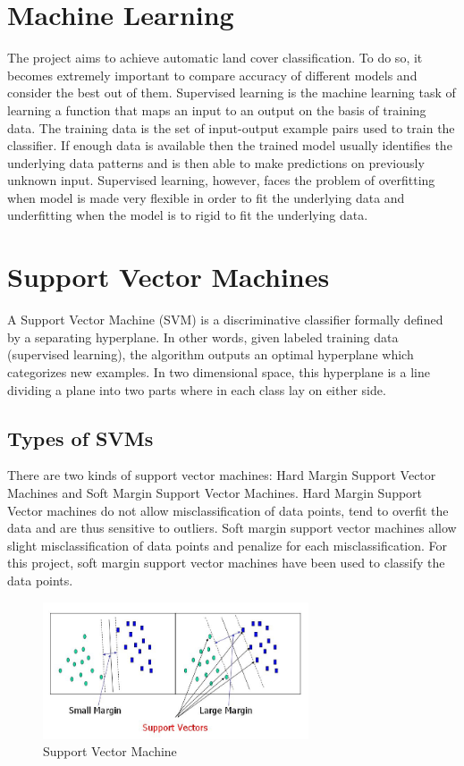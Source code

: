 \documentclass[12pt, a4paper]{report}
\begin{document}
\section{Machine Learning}
The project aims to achieve automatic land cover classification. To do so, it becomes extremely important to compare accuracy of different models and  consider the best out of them.
Supervised learning is the machine learning task of learning a function that maps an input to an output on the basis of training data.\cite{supervisedlearningone, supervisedlearningtwo} The training data is the set of input-output example pairs used to train the classifier. If enough data is available then the trained model usually identifies the underlying data patterns and is then able to make predictions on previously unknown input. Supervised learning, however, faces the problem of overfitting when model is made very flexible in order to fit the underlying data and underfitting when the model is to rigid to fit the underlying data.
\section{Support Vector Machines}
A Support Vector Machine (SVM) is a discriminative classifier formally defined by a separating hyperplane. In other words, given labeled training data (supervised learning), the algorithm outputs an optimal hyperplane which categorizes new examples. In two dimensional space, this hyperplane is a line dividing a plane into two parts where in each class lay on either side.\cite{supportvectormachines}
\subsection{Types of SVMs}
There are two kinds of support vector machines: Hard Margin Support Vector Machines and Soft Margin Support Vector Machines.
Hard Margin Support Vector machines do not allow misclassification of data points, tend to overfit the data and are thus sensitive to outliers. Soft margin support vector machines allow slight misclassification of data points and penalize for each misclassification.
For this project, soft margin support vector machines have been used to classify the data points.
\begin{figure}[h]
\centering
\includegraphics[width=0.7\textwidth]{supportvectormachines.jpg}
\caption{Support Vector Machine}
\end{figure}
\end{document}

